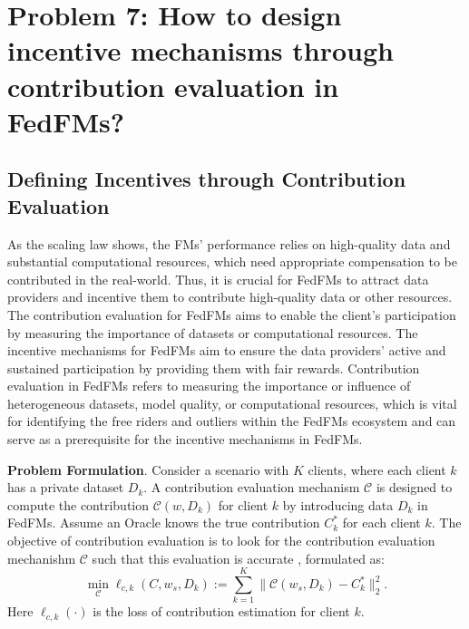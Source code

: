 \section{Problem 7: How to design incentive mechanisms through contribution evaluation in FedFMs?}
\label{con_eva}


\subsection{Defining Incentives through Contribution Evaluation}

    As the scaling law shows, the FMs' performance relies on high-quality data and substantial computational resources, which need appropriate compensation to be contributed in the real-world.
    Thus, it is crucial for FedFMs to attract data providers and incentive them to contribute high-quality data or other resources.
    The contribution evaluation for FedFMs aims to enable the client's participation by measuring the importance of datasets or computational resources.
    The incentive mechanisms for FedFMs aim to ensure the data providers' active and sustained participation by providing them with fair rewards.
    Contribution evaluation in FedFMs refers to measuring the importance or influence of heterogeneous datasets, model quality, or computational resources, which is vital for identifying the free riders and outliers within the FedFMs ecosystem and can serve as a prerequisite for the incentive mechanisms in FedFMs.

        
    
\textbf{Problem Formulation}.
Consider a scenario with \(K\)  clients, where each client \(k\) has a private dataset \(D_{k}\). A contribution evaluation mechanism $\mathcal C$ is designed to compute the contribution \(\mathcal C(w, D_k)\) for client \(k\) by introducing data $D_k$ in FedFMs. Assume an Oracle knows the true contribution $C_k^*$ for each client $k.$
The objective of contribution evaluation is to look for the contribution evaluation mechanishm $\mathcal C$ such that this evaluation is accurate \cite{song2019profit, wei2020efficient}, formulated as:
\begin{equation}
 \min_{\mathcal C}\ell_{c,k}(C,w_s,D_k)
 :=\sum_{k=1}^K\|\mathcal C(w_s, D_k) -C_k^*\|_2^2.
\end{equation}
Here ${\ell_{c,k}(\cdot)}$ is the loss of contribution estimation for client $k$.

